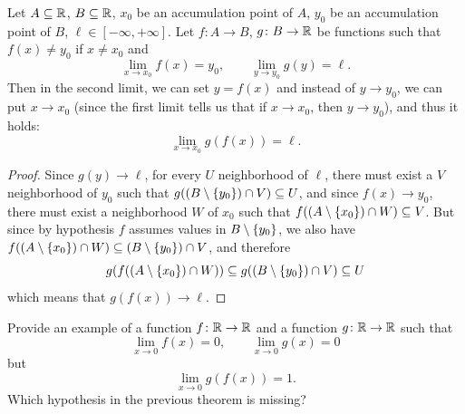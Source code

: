 \begin{theorem}
\label{th:limite_composta}
Let $A\subseteq {\mathbb R}$, $B\subseteq {\mathbb R}$,
$x_0$ be an accumulation point of $A$,
$y_0$ be an accumulation point of $B$,
$\ell\in [-\infty,+\infty]$.
Let $f\colon A \to B$, $g\colon B\to {\mathbb R}$
be functions such that $f(x)\neq y_0$ if $x\neq x_0$ and 
\[
  \lim_{x\to x_0} f(x) = y_0,
\qquad
  \lim_{y\to y_0} g(y) = \ell.
\]
Then in the second limit, we can set $y=f(x)$ and instead of $y\to y_0$, 
we can put $x\to x_0$ (since the first limit tells us that if $x\to x_0$, 
then $y\to y_0$), and thus it holds:
\[
 \lim_{x\to x_0} g(f(x)) = \ell.
\]
\end{theorem}
%
\begin{proof}
Since $g(y)\to \ell$,
for every $U$ neighborhood of $\ell$, there must exist a $V$ neighborhood of
$y_0$
such that $g((B\setminus{\left\{ y_0 \right\}})\cap V) \subseteq U$,
and since $f(x)\to y_0$, there must exist a neighborhood $W$ of $x_0$
such that $f((A\setminus{\left\{ x_0 \right\}})\cap W) \subseteq V$.
But since by hypothesis $f$ assumes values in $B\setminus{\left\{ y_0 \right\}}$,
we also have $f((A\setminus{\left\{ x_0 \right\}})\cap W)\subseteq
(B\setminus{\left\{ y_0 \right\}}) \cap V$,
and therefore
\[
    g(f((A\setminus{\left\{ x_0 \right\}})\cap W)) \subseteq g((B\setminus {\left\{ y_0 \right\}})
  \cap V)
  \subseteq U
\]
which means that $g(f(x)) \to \ell$.
\end{proof}

\begin{exercise}
  Provide an example of a function $f\colon{\mathbb R}\to {\mathbb R}$ 
  and a function $g\colon{\mathbb R}\to {\mathbb R}$ such that 
  \[
  \lim_{x\to 0} f(x) = 0, \qquad 
  \lim_{x\to 0} g(x) = 0
  \]
  but
  \[
  \lim_{x\to 0} g(f(x)) = 1.
  \]
  Which hypothesis in the previous theorem is missing?
\end{exercise}

